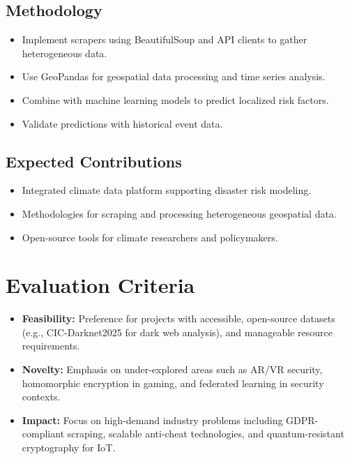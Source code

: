 \documentclass[11pt]{article}
\begin{document}
\subsection{Methodology}
\label{sec:org1d7f813}
\begin{itemize}
\item Implement scrapers using BeautifulSoup and API clients to gather heterogeneous data.
\item Use GeoPandas for geospatial data processing and time series analysis.
\item Combine with machine learning models to predict localized risk factors.
\item Validate predictions with historical event data.
\end{itemize}
\subsection{Expected Contributions}
\label{sec:org78e2980}
\begin{itemize}
\item Integrated climate data platform supporting disaster risk modeling.
\item Methodologies for scraping and processing heterogeneous geospatial data.
\item Open-source tools for climate researchers and policymakers.
\end{itemize}
\section{Evaluation Criteria}
\label{sec:org8fe2d46}
\begin{itemize}
\item \textbf{\textbf{Feasibility:}} Preference for projects with accessible, open-source datasets (e.g., CIC-Darknet2025 for dark web analysis), and manageable resource requirements.
\item \textbf{\textbf{Novelty:}} Emphasis on under-explored areas such as AR/VR security, homomorphic encryption in gaming, and federated learning in security contexts.
\item \textbf{\textbf{Impact:}} Focus on high-demand industry problems including GDPR-compliant scraping, scalable anti-cheat technologies, and quantum-resistant cryptography for IoT.
\end{itemize}
\end{document}
